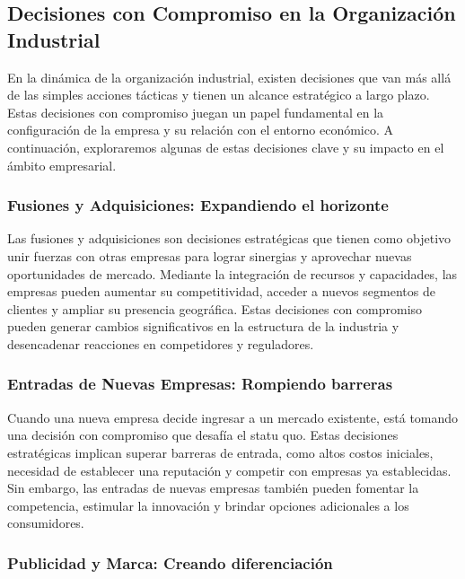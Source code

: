 \documentclass[
  doc,
  floatsintext,
  longtable,
  a4paper,
  nolmodern,
  notxfonts,
  notimes,
  colorlinks=true,linkcolor=blue,citecolor=blue,urlcolor=blue]{apa7}
\begin{document}
\subsection{Decisiones con Compromiso en la Organización
Industrial}\label{decisiones-con-compromiso-en-la-organizaciuxf3n-industrial}

En la dinámica de la organización industrial, existen decisiones que van
más allá de las simples acciones tácticas y tienen un alcance
estratégico a largo plazo. Estas decisiones con compromiso juegan un
papel fundamental en la configuración de la empresa y su relación con el
entorno económico. A continuación, exploraremos algunas de estas
decisiones clave y su impacto en el ámbito empresarial.

\subsubsection{Fusiones y Adquisiciones: Expandiendo el
horizonte}\label{fusiones-y-adquisiciones-expandiendo-el-horizonte}

Las fusiones y adquisiciones son decisiones estratégicas que tienen como
objetivo unir fuerzas con otras empresas para lograr sinergias y
aprovechar nuevas oportunidades de mercado. Mediante la integración de
recursos y capacidades, las empresas pueden aumentar su competitividad,
acceder a nuevos segmentos de clientes y ampliar su presencia
geográfica. Estas decisiones con compromiso pueden generar cambios
significativos en la estructura de la industria y desencadenar
reacciones en competidores y reguladores.

\subsubsection{Entradas de Nuevas Empresas: Rompiendo
barreras}\label{entradas-de-nuevas-empresas-rompiendo-barreras}

Cuando una nueva empresa decide ingresar a un mercado existente, está
tomando una decisión con compromiso que desafía el statu quo. Estas
decisiones estratégicas implican superar barreras de entrada, como altos
costos iniciales, necesidad de establecer una reputación y competir con
empresas ya establecidas. Sin embargo, las entradas de nuevas empresas
también pueden fomentar la competencia, estimular la innovación y
brindar opciones adicionales a los consumidores.

\subsubsection{Publicidad y Marca: Creando
diferenciación}\label{publicidad-y-marca-creando-diferenciaciuxf3n}
\end{document}
